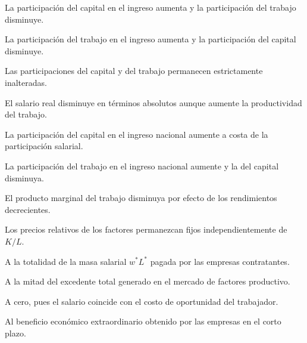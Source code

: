 \begin{opts}
    \item La participación del capital en el ingreso aumenta y la participación del trabajo disminuye.
    \item La participación del trabajo en el ingreso aumenta y la participación del capital disminuye.
    \item Las participaciones del capital y del trabajo permanecen estrictamente inalteradas.
    \item El salario real disminuye en términos absolutos aunque aumente la productividad del trabajo.
\end{opts}

\begin{opts}
    \item La participación del capital en el ingreso nacional aumente a costa de la participación salarial.
    \item La participación del trabajo en el ingreso nacional aumente y la del capital disminuya.
    \item El producto marginal del trabajo disminuya por efecto de los rendimientos decrecientes.
    \item Los precios relativos de los factores permanezcan fijos independientemente de $K/L$.
\end{opts}

\begin{opts}
    \item A la totalidad de la masa salarial $w^* L^*$ pagada por las empresas contratantes.
    \item A la mitad del excedente total generado en el mercado de factores productivo.
    \item A cero, pues el salario coincide con el costo de oportunidad del trabajador.
    \item Al beneficio económico extraordinario obtenido por las empresas en el corto plazo.
\end{opts}

